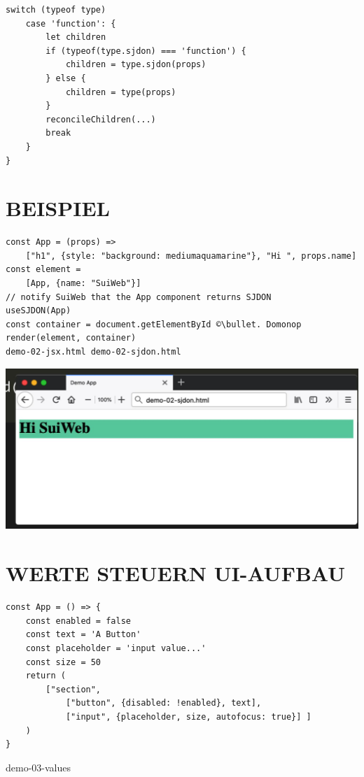 \documentclass[10pt]{article}
\begin{document}
\begin{verbatim}
switch (typeof type)
    case 'function': {
        let children
        if (typeof(type.sjdon) === 'function') {
            children = type.sjdon(props)
        } else {
            children = type(props)
        }
        reconcileChildren(...)
        break
    }
}
\end{verbatim}

\section*{BEISPIEL}
\begin{verbatim}
const App = (props) =>
    ["h1", {style: "background: mediumaquamarine"}, "Hi ", props.name]
const element =
    [App, {name: "SuiWeb"}]
// notify SuiWeb that the App component returns SJDON
useSJDON(App)
const container = document.getElementById ©\bullet. Domonop
render(element, container)
demo-02-jsx.html demo-02-sjdon.html
\end{verbatim}

\begin{center}
\includegraphics[width=\linewidth]{images/2025_01_02_254b5e4c52d090c313e1g-25}
\end{center}

\section*{WERTE STEUERN UI-AUFBAU}
\begin{verbatim}
const App = () => {
    const enabled = false
    const text = 'A Button'
    const placeholder = 'input value...'
    const size = 50
    return (
        ["section",
            ["button", {disabled: !enabled}, text],
            ["input", {placeholder, size, autofocus: true}] ]
    )
}
\end{verbatim}

demo-03-values
\end{document}
